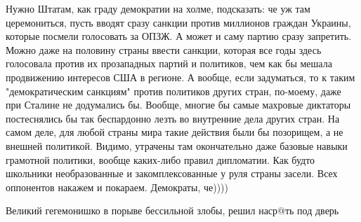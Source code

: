\begin{itemize}
Нужно Штатам, как граду демократии на холме, подсказать: че уж там
церемониться, пусть вводят сразу санкции против миллионов граждан Украины,
которые посмели голосовать за ОПЗЖ. А может и саму партию сразу запретить.
Можно даже на половину страны ввести санкции, которая все годы здесь голосовала
против их прозападных партий и политиков, чем как бы мешала продвижению
интересов США в регионе. А вообще, если задуматься, то к таким "демократическим
санкциям" против политиков других стран, по-моему, даже при Сталине не
додумались бы. Вообще, многие бы самые махровые диктаторы постеснялись бы так
беспардонно лезть во внутренние дела других стран. На самом деле, для любой
страны мира такие действия были бы позорищем, а не внешней политикой. Видимо,
утрачены там окончательно даже базовые навыки грамотной политики, вообще
каких-либо правил дипломатии. Как будто школьники необразованные и
закомплексованные у руля страны засели. Всех оппонентов накажем и покараем.
Демократы, че))))


Великий гегемонишко в порыве бессильной злобы, решил наср@ть под дверь


\end{itemize} %
